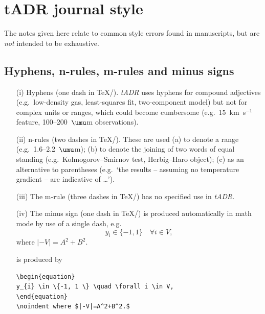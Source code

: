 \documentclass{tADR2e}
\begin{document}
\section{{\bi tADR} journal style}

The notes given here relate to common style errors found in manuscripts, but are {\itshape not\/}
intended to be exhaustive.


\subsection{Hyphens, n-rules, m-rules and minus signs}\label{dashes}

\begin{enumerate}
\item[(i)] Hyphens (one dash in \TeX/\LaTeXe). {\it tADR} uses hyphens for compound adjectives (e.g.\ low-density gas, least-squares fit,
two-component  model) but not for complex  units  or ranges, which could become cumbersome (e.g.\ 15~km~s$^{-1}$
feature, 100--200~$\umu$m observations).

\item[(ii)] n-rules (two dashes in \TeX/\LaTeXe). These are used (a) to denote a range (e.g.\ 1.6--2.2~$\umu$m);
(b) to denote the joining of two words of equal standing (e.g.\ Kolmogorov--Smirnov  test, Herbig--Haro object);
(c) as an alternative to parentheses (e.g.\ `the results -- assuming no temperature gradient -- are indicative of \ldots').

\item[(iii)] The  m-rule (three dashes in \TeX/\LaTeXe) has no specified use in {\it tADR}.

\item[(iv)] The minus sign (one dash in \TeX/\LaTeXe) is produced
automatically in math mode by use of a single dash, e.g.
\begin{equation}
y_{i} \in \{-1, 1 \} \quad \forall i \in V,
\end{equation}
\noindent where $|-V|=A^2+B^2.$\medskip

\noindent is produced by

\begin{verbatim}
\begin{equation}
y_{i} \in \{-1, 1 \} \quad \forall i \in V,
\end{equation}
\noindent where $|-V|=A^2+B^2.$
\end{verbatim}

\end{enumerate}
\end{document}
